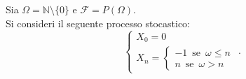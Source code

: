 \documentclass[11pt,largemargins]{homework}
\begin{document}
  
  \newpage
  \section{}%
  
  Sia $\Omega=\mathbb{N}\setminus \{0\}$ e $\mathcal{F}=P\left(\Omega\right)$.\\
  Si consideri il seguente processo stocastico:
  \begin{equation*}
  \begin{cases} X_{0}=0\\X_{n}=\begin{cases}-1 \,\,\, \text{se} \,\,\, \omega\leq n\\n \,\,\, \text{se} \,\,\, \omega> n\end{cases} \end{cases}.
  \end{equation*}
  
\end{document}
